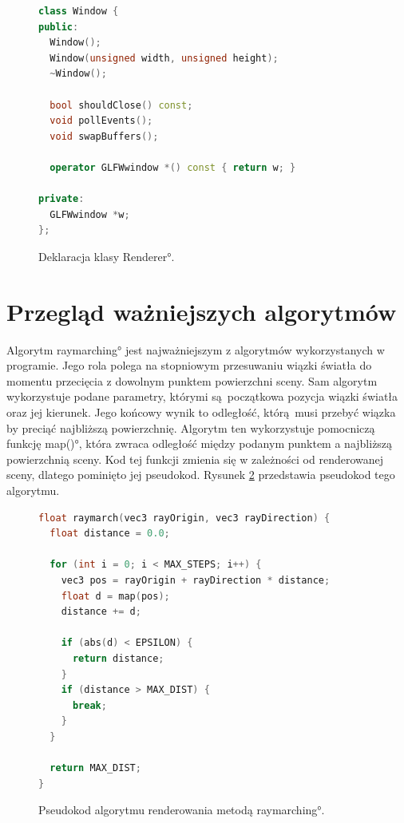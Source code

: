 \begin{figure}[H]
\centering
\begin{lstlisting}[language=C++]
class Window {
public:
  Window();
  Window(unsigned width, unsigned height);
  ~Window();

  bool shouldClose() const;
  void pollEvents();
  void swapBuffers();

  operator GLFWwindow *() const { return w; }

private:
  GLFWwindow *w;
};
\end{lstlisting}
\caption{Deklaracja klasy \ang{Renderer}.}
\label{fig:c++:window}
\end{figure}

\section{Przegląd ważniejszych algorytmów}

Algorytm \ang{raymarching} jest najważniejszym z algorytmów wykorzystanych w programie. Jego rola polega na stopniowym
przesuwaniu wiązki światła do momentu przecięcia z dowolnym punktem powierzchni sceny. Sam algorytm wykorzystuje podane parametry, którymi są początkowa pozycja wiązki światła oraz jej kierunek. Jego końcowy wynik to odległość, którą musi przebyć wiązka by preciąć najbliższą powierzchnię. Algorytm ten wykorzystuje pomocniczą funkcję
\ang{map()}, która zwraca odległość między podanym punktem a najbliższą powierzchnią sceny. Kod tej funkcji zmienia się w zależności od renderowanej sceny, dlatego pominięto jej pseudokod.
Rysunek \ref{fig:pseudokod:raymarching} przedstawia pseudokod tego algorytmu.

\begin{figure}[H]
\centering
\begin{lstlisting}[language=C]
float raymarch(vec3 rayOrigin, vec3 rayDirection) {
  float distance = 0.0;

  for (int i = 0; i < MAX_STEPS; i++) {
    vec3 pos = rayOrigin + rayDirection * distance;
    float d = map(pos);
    distance += d;

    if (abs(d) < EPSILON) {
      return distance;
    }
    if (distance > MAX_DIST) {
      break;
    }
  }

  return MAX_DIST;
}
\end{lstlisting}
\caption{Pseudokod algorytmu renderowania metodą \ang{raymarching}.}
\label{fig:pseudokod:raymarching}
\end{figure}

